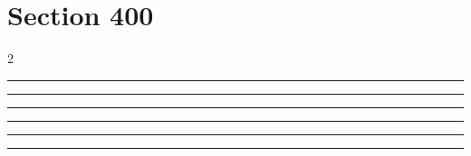 \documentclass[11pt,a4paper]{article}
\begin{document}
\section{Section 400}
\begin{multicols}{2}
\begin{swarmwrap}%
  \begin{minipage}[t]{2cm}
    \centering
    \textcolor{blue!30}{\rule{\linewidth}{6cm}}
  \end{minipage}%
\end{swarmwrap}%
\swarmwrapnext\lipsum[1]\lipsum[2]
\end{multicols}
\begin{swarmwrap}%
  \begin{minipage}[t]{3cm}
    \centering
    \textcolor{red!20}{\rule{\linewidth}{7cm}}
  \end{minipage}%
\end{swarmwrap}%
\swarmwrapnext\lipsum[1]\lipsum[2]\lipsum[3]\lipsum[4]\lipsum[5]\lipsum[6]
\begin{swarmwrap}%
  \begin{minipage}[t]{4cm}
    \centering
    \textcolor{red!20}{\rule{\linewidth}{8cm}}
  \end{minipage}%
\end{swarmwrap}%
\swarmwrapnext\lipsum[1]
\begin{swarmwrap}%
  \begin{minipage}[t]{5cm}
    \centering
    \textcolor{red!20}{\rule{\linewidth}{9cm}}
  \end{minipage}%
\end{swarmwrap}%
\swarmwrapnext\lipsum[1]\lipsum[2]
\begin{swarmwrap}%
  \begin{minipage}[t]{2cm}
    \centering
    \textcolor{red!20}{\rule{\linewidth}{10cm}}
  \end{minipage}%
\end{swarmwrap}%
\swarmwrapnext\lipsum[1]\lipsum[2]\lipsum[3]
\begin{swarmwrap}%
  \begin{minipage}[t]{3cm}
    \centering
    \textcolor{red!20}{\rule{\linewidth}{2cm}}
  \end{minipage}%
\end{swarmwrap}%
\swarmwrapnext\lipsum[1]\lipsum[2]\lipsum[3]\lipsum[4]
\end{document}
